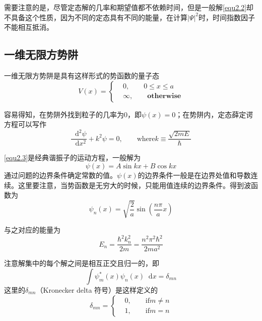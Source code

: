 \documentclass[UTF8]{ctexart}
\newcommand*{\dif}{\mathop{}\!\mathrm{d}}
\begin{document}
    需要注意的是，尽管定态解的几率和期望值都不依赖时间，但是一般解\autoref{equ2.2}却不具备这个性质，因为不同的定态具有不同的能量，在计算$|\Psi|^2$时，时间指数因子不能相互抵消。

    \subsection{一维无限方势阱}
    一维无限方势阱是具有这样形式的势函数的量子态
    \begin{equation}
        V(x) = \left\{\begin{aligned}
            &0, \qquad 0 \le x \le a \\
            &\infty , \qquad \textbf{otherwise}
        \end{aligned} 
        \right.
    \end{equation}

    容易得知，在势阱外找到粒子的几率为0，即$\psi(x) = 0$；在势阱内，定态薛定谔方程可以写作
    \begin{equation}
        \frac{\dif^2 \psi}{\dif x^2} + k^2 \psi =0, \qquad \text{where} k \equiv \frac{\sqrt{2 m E}}{\hbar} \label{equ2.3}
    \end{equation}

\noindent \autoref{equ2.3}是经典谐振子的运动方程，一般解为
\begin{equation}
    \psi(x) = A \sin kx + B \cos kx
\end{equation}
\noindent 通过问题的边界条件确定常数的值。$\psi(x)$的边界条件一般是在边界处值和导数连续。这里要注意，当势函数是无穷大的时候，只能用值连续的边界条件。得到波函数为
    \begin{equation}
        \psi_n(x) = \sqrt{\frac{2}{a}} \sin (\frac{n \pi}{a} x)
    \end{equation}

    与之对应的能量为
    \begin{equation}
        E_n = \frac{\hbar^2 k_n^2}{2m} = \frac{n^2 \pi^2 \hbar^2}{2m a^2}
    \end{equation}

    注意解集中的每个解之间是相互正交且归一的，即
    \begin{equation}
        \int \psi_m^*(x) \psi_n(x) \dif x = \delta_{mn}
    \end{equation}
\noindent 这里的$\delta_{mn}$（Kronecker delta 符号）是这样定义的
\begin{equation}
    \delta_{mn} = \left\{\begin{aligned}
        &0, \qquad \text{if} m \neq n \\
        &1, \qquad \text{if} m = n
    \end{aligned}\right.
\end{equation}
\end{document}
